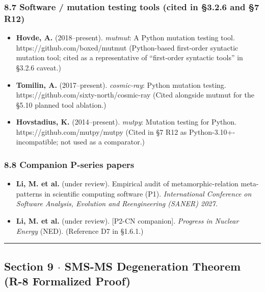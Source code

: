 \documentclass[review,12pt,authoryear]{elsarticle}
\providecommand{\tightlist}{\setlength{\itemsep}{0pt}\setlength{\parskip}{0pt}}
\begin{document}
\subsubsection{8.7 Software / mutation testing tools (cited in §3.2.6
and §7
R12)}\label{software-mutation-testing-tools-cited-in-3.2.6-and-7-r12}

\begin{itemize}
\tightlist
\item
  \textbf{Hovde, A.} (2018--present). \emph{mutmut}: A Python mutation
  testing tool. https://github.com/boxed/mutmut (Python-based
  first-order syntactic mutation tool; cited as a representative of
  ``first-order syntactic tools'' in §3.2.6 caveat.)
\item
  \textbf{Tomilin, A.} (2017--present). \emph{cosmic-ray}: Python
  mutation testing. https://github.com/sixty-north/cosmic-ray (Cited
  alongside mutmut for the §5.10 planned tool ablation.)
\item
  \textbf{Hovstadius, K.} (2014--present). \emph{mutpy}: Mutation
  testing for Python. https://github.com/mutpy/mutpy (Cited in §7 R12 as
  Python-3.10+-incompatible; not used as a comparator.)
\end{itemize}

\subsubsection{8.8 Companion P-series
papers}\label{companion-p-series-papers}

\begin{itemize}
\tightlist
\item
  \textbf{Li, M. et al.} (under review). Empirical audit of
  metamorphic-relation meta-patterns in scientific computing software
  (P1). \emph{International Conference on Software Analysis, Evolution
  and Reengineering (SANER) 2027.}
\item
  \textbf{Li, M. et al.} (under review). {[}P2-CN companion{]}.
  \emph{Progress in Nuclear Energy} (NED). (Reference D7 in §1.6.1.)
\end{itemize}

\begin{center}\rule{0.5\linewidth}{0.5pt}\end{center}

\subsection{Section 9 $\cdot$ SMS-MS Degeneration Theorem (R-8 Formalized
Proof)}\label{section-9-sms-ms-degeneration-theorem-r-8-formalized-proof}
\end{document}
